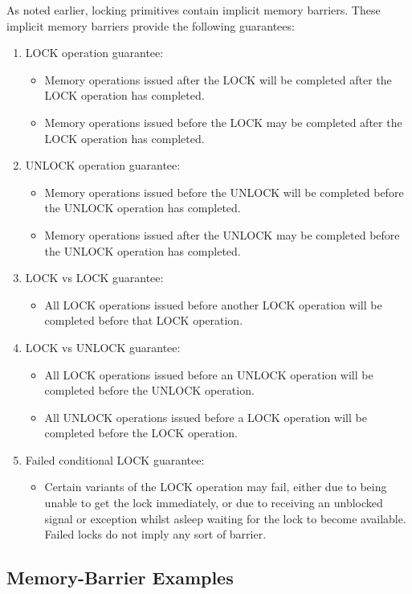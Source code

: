 As noted earlier, locking primitives contain implicit memory barriers.
These implicit memory barriers provide the following guarantees:
\begin{enumerate}
\item	LOCK operation guarantee:
	\begin{itemize}
	\item	Memory operations issued after the LOCK will be completed
		after the LOCK operation has completed.
	\item	Memory operations issued before the LOCK may be completed
		after the LOCK operation has completed.
	\end{itemize}
\item	UNLOCK operation guarantee:
	\begin{itemize}
	\item	Memory operations issued before the UNLOCK will be
		completed before the UNLOCK operation has completed.
	\item	Memory operations issued after the UNLOCK may be completed
		before the UNLOCK operation has completed.
	\end{itemize}
\item	LOCK vs LOCK guarantee:
	\begin{itemize}
	\item	All LOCK operations issued before another LOCK operation
		will be completed before that LOCK operation.
	\end{itemize}
\item	LOCK vs UNLOCK guarantee:
	\begin{itemize}
	\item	All LOCK operations issued before an UNLOCK operation
		will be completed before the UNLOCK operation.
	\item	All UNLOCK operations issued before a LOCK operation
		will be completed before the LOCK operation.
	\end{itemize}
\item	Failed conditional LOCK guarantee:
	\begin{itemize}
	\item	Certain variants of the LOCK operation may fail, either
		due to being unable to get the lock immediately, or due
		to receiving an unblocked signal or exception
		whilst asleep waiting
		for the lock to become available.  Failed locks do not
		imply any sort of barrier.
	\end{itemize}
\end{enumerate}

\subsection{Memory-Barrier Examples}
\label{sec:advsync:Memory-Barrier Examples}

